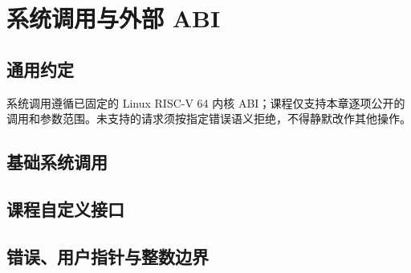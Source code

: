 \chapter{系统调用与外部 ABI}

\section{通用约定}
系统调用遵循已固定的 Linux RISC-V 64 内核 ABI；课程仅支持本章逐项公开的调用和参数范围。未支持的请求须按指定错误语义拒绝，不得静默改作其他操作。

\section{基础系统调用}

\section{课程自定义接口}

\section{错误、用户指针与整数边界}
